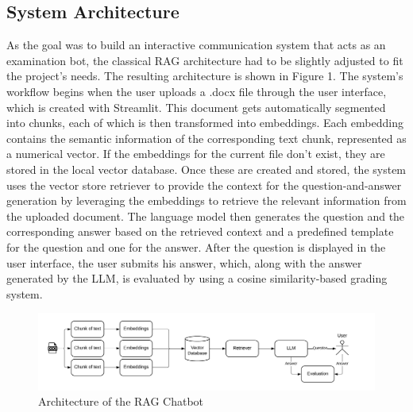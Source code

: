 \documentclass{article}
\begin{document}
\subsection{System Architecture}
As the goal was to build an interactive communication system that acts as an examination bot, the classical RAG architecture had to be slightly adjusted to fit the project's needs. The resulting architecture is shown in Figure 1. The system's workflow begins when the user uploads a .docx file through the user interface, which is created with Streamlit. This document gets automatically segmented into chunks, each of which is then transformed into embeddings. Each embedding contains the semantic information of the corresponding text chunk, represented as a numerical vector. If the embeddings for the current file don't exist, they are stored in the local vector database. Once these are created and stored, the system uses the vector store retriever to provide the context for the question-and-answer generation by leveraging the embeddings to retrieve the relevant information from the uploaded document. The language model then generates the question and the corresponding answer based on the retrieved context and a predefined template for the question and one for the answer. After the question is displayed in the user interface, the user submits his answer, which, along with the answer generated by the LLM, is evaluated by using a cosine similarity-based grading system. 
\begin{figure}[h]
    \centering
    \includegraphics[width=\textwidth]{Images/overview_system_architecture.png}
    \caption{Architecture of the RAG Chatbot}
\end{figure}
\end{document}
